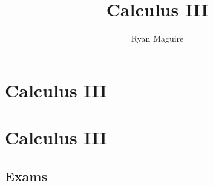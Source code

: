 \documentclass[crop=false,class=book,oneside]{standalone}
\begin{document}
    \newif\ifmathcoursescalculusIII
    \ifx\ifmathcourses\undefined
        \title{Calculus III}
        \author{Ryan Maguire}
        \date{\vspace{-5ex}}
        \maketitle
        \tableofcontents
        \chapter*{Calculus III}
        \setcounter{chapter}{1}
    \else
        \chapter{Calculus III}
    \fi
    \section{Exams}
\end{document}
